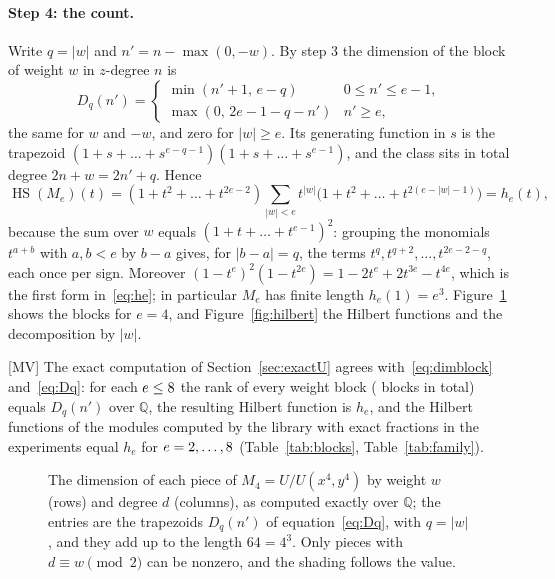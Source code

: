 \documentclass[11pt]{article}
\theoremstyle{definition}
\theoremstyle{remark}
\newcommand{\Q}{\mathbb{Q}}
\newcommand{\Hilb}{\operatorname{HS}}
\begin{document}
\paragraph{Step 4: the count.} Write $q=|w|$ and $n'=n-\max(0,-w)$. By step 3 the dimension of the block of weight $w$ in $z$-degree $n$ is
\begin{equation}\label{eq:Dq}
D_q(n')=\begin{cases}\min(n'+1,\,e-q)&0\le n'\le e-1,\\ \max(0,\,2e-1-q-n')&n'\ge e,\end{cases}
\end{equation}
the same for $w$ and $-w$, and zero for $|w|\ge e$. Its generating function in $s$ is the trapezoid $(1+s+\dots+s^{e-q-1})(1+s+\dots+s^{e-1})$, and the class sits in total degree $2n+w=2n'+q$. Hence
\begin{equation}\label{eq:HSMe}
\Hilb(M_e)(t)=(1+t^2+\dots+t^{2e-2})\sum_{|w|<e}t^{|w|}\big(1+t^2+\dots+t^{2(e-|w|-1)}\big)=h_e(t),
\end{equation}
because the sum over $w$ equals $(1+t+\dots+t^{e-1})^2$: grouping the monomials $t^{a+b}$ with $a,b<e$ by $b-a$ gives, for $|b-a|=q$, the terms $t^q,t^{q+2},\dots,t^{2e-2-q}$, each once per sign. Moreover $(1-t^e)^2(1-t^{2e})=1-2t^e+2t^{3e}-t^{4e}$, which is the first form in~\eqref{eq:he}; in particular $M_e$ has finite length $h_e(1)=e^3$. Figure~\ref{fig:weight} shows the blocks for $e=4$, and Figure~\ref{fig:hilbert} the Hilbert functions and the decomposition by $|w|$.

[MV] The exact computation of Section~\ref{sec:exactU} agrees with~\eqref{eq:dimblock} and~\eqref{eq:Dq}: for each $e\le8$ the rank of every weight block (\nblocksChecked{} blocks in total) equals $D_q(n')$ over $\Q$, the resulting Hilbert function is $h_e$, and the Hilbert functions of the modules computed by the library with exact fractions in the experiments equal $h_e$ for $e=2,\dots,8$ (Table~\ref{tab:blocks}, Table~\ref{tab:family}).

\begin{figure}[htbp]
\centering

\caption{The dimension of each piece of $M_4=U/U(x^4,y^4)$ by weight $w$ (rows) and degree $d$ (columns), as computed exactly over $\Q$; the entries are the trapezoids $D_q(n')$ of equation~\eqref{eq:Dq}, with $q=|w|$, and they add up to the length $64=4^3$. Only pieces with $d\equiv w\pmod 2$ can be nonzero, and the shading follows the value.}
\label{fig:weight}
\end{figure}
\end{document}

